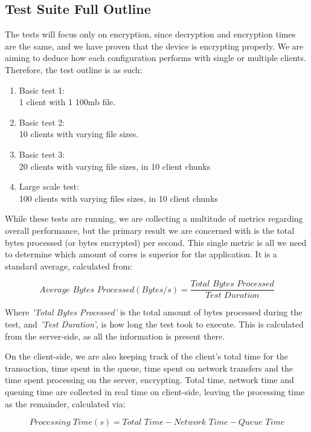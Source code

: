 \subsection{Test Suite Full Outline}
The tests will focus only on encryption, since decryption and encryption times are the same, and we have proven that the device is encrypting properly. We are aiming to deduce how each configuration performs with single or multiple clients. Therefore, the test outline is as such:
\begin{enumerate}
    \item Basic test 1: \\
    1 client with 1 100mb file.
    \item Basic test 2: \\
    10 clients with varying file sizes.
    \item Basic test 3: \\
    20 clients with varying file sizes, in 10 client chunks
    \item Large scale test: \\
    100 clients with varying files sizes, in 10 client chunks
\end{enumerate}


While these tests are running, we are collecting a multitude of metrics regarding overall performance, but the primary result we are concerned with is the total bytes processed (or bytes encrypted) per second. This single metric is all we need to determine which amount of cores is superior for the application. It is a standard average, calculated from:

$$\textit{Average Bytes Processed}(Bytes/s)=\frac{\textit{Total Bytes Processed}}{\textit{Test Duration}}$$

Where \textit{'Total Bytes Processed'} is the total amount of bytes processed during the test, and \textit{'Test Duration'}, is how long the test took to execute. This is calculated from the server-side, as all the information is present there.

On the client-side, we are also keeping track of the client's total time for the transaction, time spent in the queue, time spent on network transfers and the time spent processing on the server, \ie encrypting. Total time, network time and queuing time are collected in real time on client-side, leaving the processing time as the remainder, calculated via:

$$\textit{Processing Time}(s)=\textit{Total Time} - \textit{Network Time} - \textit{Queue Time}$$


